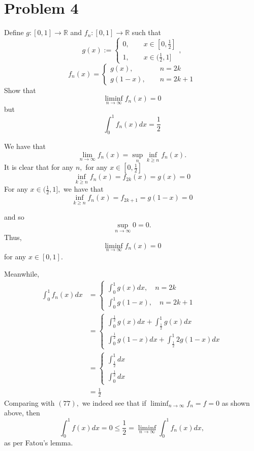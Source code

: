\documentclass[11pt]{article}
\newcommand{\bbR}{\mathbb{R}}
\begin{document}
\section*{Problem 4}
\begin{problem}
    Define $g: [0,1] \to \bbR$ and $f_n: [0, 1] \to \bbR$ such that
    \[g(x) := \begin{cases}
        0, \qquad x \in [0, \frac{1}{2}]\\
        1, \qquad x \in (\frac{1}{2}, 1]
    \end{cases},\]
    \[f_{n}(x) = 
    \begin{cases}
        g(x), \quad \:\;\:\qquad n = 2k\\
        g(1-x), \qquad n = 2k + 1
    \end{cases}\]
    Show that 
    \[\liminf_{n\to \infty}f_n(x) = 0\] but 
    \[\int_0^1 f_n(x)dx = \frac{1}{2}\]
\end{problem}
\begin{solution}
    We have that 
    \[\lim_{n\to \infty}f_n(x) = \sup_{n}\inf_{k\geq n}f_n(x).\] It is clear that for any $n,$ for any $x \in [0,\frac{1}{2}]$ 
    \[\inf_{k \geq n} f_n(x) = f_{2k}(x) = g(x) = 0\] For any $x\in (\frac{1}{2}, 1],$ we have that 
    \[\inf_{k\geq n}f_n(x) = f_{2k+1} = g(1-x) = 0\]
    
    and so 
    \[\sup_{n\to \infty } 0 = 0.\] Thus, \[\liminf_{n\to \infty}f_n(x) = 0\] for any $x\in [0,1].$ 

    Meanwhile, 
    \begin{align*}
    \int_0^1 f_n(x)dx &= \begin{cases}
        \int_0^1 g(x)dx, \quad n = 2k\\
        \int_0^1 g(1-x), \quad n = 2k+1
    \end{cases}\\ &=
    \begin{cases}
        \int_0^\frac{1}{2} g(x)dx + \int_\frac{1}{2}^1 g(x)dx\\
        \int_0^\frac{1}{2} g(1-x)dx + \int_\frac{1}{2}^1{2} g(1-x)dx
    \end{cases}\\ &= \begin{cases}
        \int_\frac{1}{2}^1 dx\\
        \int_0^\frac{1}{2} dx
    \end{cases}\\ &= \frac{1}{2}    
    \end{align*}
Comparing with $(77),$ we indeed see that if $\liminf_{n\to \infty}f_n = f = 0$ as shown above, then 
\[\int_0^1 f(x) dx = 0 \leq \frac{1}{2} = \liminf_{n\to \infty}\int_0^1 f_n(x) dx,\] as per Fatou's lemma.
\end{solution}
\end{document}
